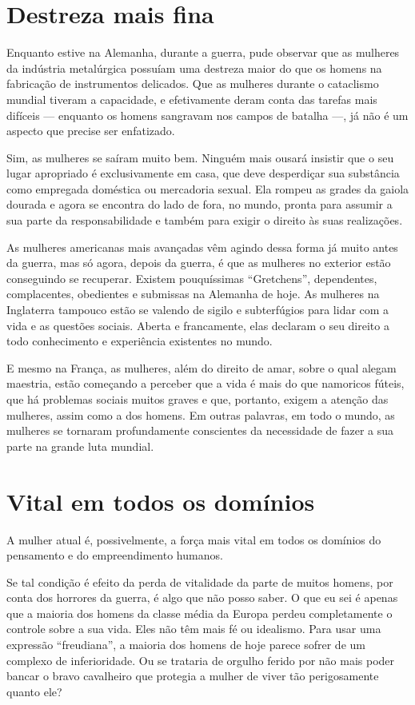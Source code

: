 \section{Destreza mais fina}

Enquanto estive na Alemanha, durante a guerra, pude observar que as
mulheres da indústria metalúrgica possuíam uma destreza maior do que os
homens na fabricação de instrumentos delicados. Que as mulheres durante
o cataclismo mundial tiveram a capacidade, e efetivamente
deram conta das tarefas mais difíceis --- enquanto os homens sangravam
nos campos de batalha ---, já não é um aspecto que precise ser
enfatizado.

Sim, as mulheres se saíram muito bem. Ninguém mais ousará
insistir que o seu lugar apropriado é exclusivamente em casa, que deve
desperdiçar sua substância como empregada doméstica ou mercadoria
sexual. Ela rompeu as grades da gaiola dourada e agora se encontra do
lado de fora, no mundo, pronta para assumir a sua parte da
responsabilidade e também para exigir o direito às suas realizações.

As mulheres americanas mais avançadas vêm agindo dessa forma já muito
antes da guerra, mas só agora, depois da guerra, é que as mulheres no
exterior estão conseguindo se recuperar. Existem pouquíssimas
``Gretchens'', dependentes, complacentes, obedientes e submissas na
Alemanha de hoje. As mulheres na Inglaterra tampouco estão se valendo de
sigilo e subterfúgios para lidar com a vida e as questões sociais.
Aberta e francamente, elas declaram o seu direito a todo
conhecimento e experiência existentes no mundo.

E mesmo na França, as mulheres, além do direito de amar, sobre o qual
alegam maestria, estão começando a perceber que a vida é mais do que
namoricos fúteis, que há problemas sociais muitos graves e que,
portanto, exigem a atenção das mulheres, assim como a dos homens. Em
outras palavras, em todo o mundo, as mulheres se tornaram profundamente
conscientes da necessidade de fazer a sua parte na grande luta mundial.

\section{Vital em todos os domínios}

A mulher atual é, possivelmente, a força mais vital em todos os domínios
do pensamento e do empreendimento humanos.

Se tal condição é efeito da perda de vitalidade da parte de muitos homens, por
conta dos horrores da guerra, é algo que não posso saber. O que eu sei é
apenas que a maioria dos homens da classe média da Europa perdeu completamente o
controle sobre a sua vida. Eles não têm mais fé ou idealismo. Para usar
uma expressão ``freudiana'', a maioria dos homens de hoje parece sofrer
de um complexo de inferioridade. Ou se trataria de orgulho ferido por
não mais poder bancar o bravo cavalheiro que protegia a mulher de viver
tão perigosamente quanto ele?

